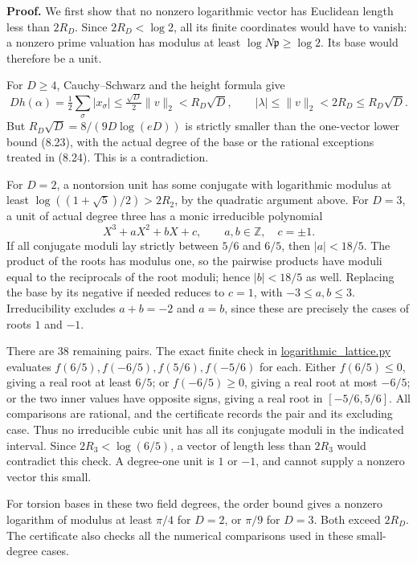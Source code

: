 \documentclass[
  11pt,
  a4paper,
]{article}
\begin{document}
\textbf{Proof.} We first show that no nonzero logarithmic vector has
Euclidean length less than \(2R_D\). Since \(2R_D<\log2\), all its
finite coordinates would have to vanish: a nonzero prime valuation has
modulus at least \(\log N\mathfrak p\ge\log2\). Its base would therefore
be a unit.

For \(D\ge4\), Cauchy--Schwarz and the height formula give \[
D h(\alpha)=\tfrac12\sum_{\sigma}|x_\sigma|
\le\tfrac{\sqrt D}{2}\|v\|_2<R_D\sqrt D,
\qquad
|\lambda|\le\|v\|_2<2R_D\le R_D\sqrt D.
\] But \(R_D\sqrt D=8/(9D\log(eD))\) is strictly smaller than the
one-vector lower bound (8.23), with the actual degree of the base or the
rational exceptions treated in (8.24). This is a contradiction.

For \(D=2\), a nontorsion unit has some conjugate with logarithmic
modulus at least \(\log((1+\sqrt5)/2)>2R_2\), by the quadratic argument
above. For \(D=3\), a unit of actual degree three has a monic
irreducible polynomial \[
X^3+aX^2+bX+c,\qquad a,b\in\mathbb Z,\quad c=\pm1.
\] If all conjugate moduli lay strictly between \(5/6\) and \(6/5\),
then \(|a|<18/5\). The product of the roots has modulus one, so the
pairwise products have moduli equal to the reciprocals of the root
moduli; hence \(|b|<18/5\) as well. Replacing the base by its negative
if needed reduces to \(c=1\), with \(-3\le a,b\le3\). Irreducibility
excludes \(a+b=-2\) and \(a=b\), since these are precisely the cases of
roots \(1\) and \(-1\).

There are 38 remaining pairs. The exact finite check in
\href{https://kokunoyumeto.github.io/open-math-courses-public/courses/TR-BAKER/verification/logarithmic_lattice.py}{logarithmic\_lattice.py}
evaluates \(f(6/5),f(-6/5),f(5/6),f(-5/6)\) for each. Either
\(f(6/5)\le0\), giving a real root at least \(6/5\); or \(f(-6/5)\ge0\),
giving a real root at most \(-6/5\); or the two inner values have
opposite signs, giving a real root in \([-5/6,5/6]\). All comparisons
are rational, and the certificate records the pair and its excluding
case. Thus no irreducible cubic unit has all its conjugate moduli in the
indicated interval. Since \(2R_3<\log(6/5)\), a vector of length less
than \(2R_3\) would contradict this check. A degree-one unit is \(1\) or
\(-1\), and cannot supply a nonzero vector this small.

For torsion bases in these two field degrees, the order bound gives a
nonzero logarithm of modulus at least \(\pi/4\) for \(D=2\), or
\(\pi/9\) for \(D=3\). Both exceed \(2R_D\). The certificate also checks
all the numerical comparisons used in these small-degree cases.
\end{document}
